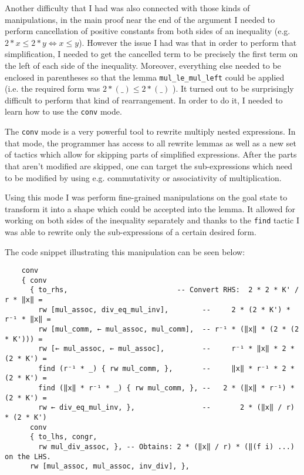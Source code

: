 \documentclass[11pt]{article}
\newenvironment{code}{\captionsetup{type=listing}}{}
\begin{document}
Another difficulty that I had was also connected with those kinds of manipulations,
in the main proof near the end of the argument I needed to perform cancellation
of positive constants from both sides of an inequality (e.g. $2 * x \le 2 * y \iff x \le y$).
However the issue I had was that in order to perform that simplification, I needed to
get the cancelled term to be precisely the first term on the left of each side of
the inequality. Moreover, everything else needed to be enclosed in parentheses so that
the lemma \texttt{mul\_le\_mul\_left} could be applied (i.e. the required form was
$2 * (\_) \le 2 * (\_)$ ). It turned out to be surprisingly difficult to perform that
kind of rearrangement. In order to do it, I needed to learn how to use the
\texttt{conv} mode.

The \texttt{conv} mode is a very powerful tool to rewrite multiply nested
expressions. In that mode, the programmer has access to all rewrite lemmas as well
as a new set of tactics which allow for skipping parts of simplified expressions.
After the parts that aren't modified are skipped, one can target the sub-expressions
which need to be modified by using e.g. commutativity or associativity of multiplication.

Using this mode I was perform fine-grained manipulations on the goal state to
transform it into a shape which could be accepted into the lemma. It allowed for
working on both sides of the inequality separately and thanks to the \texttt{find}
tactic I was able to rewrite only the sub-expressions of a certain desired form.

The code snippet illustrating this manipulation can be seen below:
\begin{code}
\begin{verbatim}
    conv
    { conv
      { to_rhs,                          -- Convert RHS:  2 * 2 * K' / r * ‖x‖ =
        rw [mul_assoc, div_eq_mul_inv],        --     2 * (2 * K') * r⁻¹ * ‖x‖ =
        rw [mul_comm, ← mul_assoc, mul_comm],  -- r⁻¹ * (‖x‖ * (2 * (2 * K'))) =
        rw [← mul_assoc, ← mul_assoc],         --     r⁻¹ * ‖x‖ * 2 * (2 * K') =
        find (r⁻¹ * _) { rw mul_comm, },       --     ‖x‖ * r⁻¹ * 2 * (2 * K') =
        find (‖x‖ * r⁻¹ * _) { rw mul_comm, }, --   2 * (‖x‖ * r⁻¹) * (2 * K') =
        rw ← div_eq_mul_inv, },                --       2 * (‖x‖ / r) * (2 * K')
      conv
      { to_lhs, congr,
        rw mul_div_assoc, }, -- Obtains: 2 * (‖x‖ / r) * (‖(f i) ...) on the LHS.
      rw [mul_assoc, mul_assoc, inv_div], },
\end{verbatim}
\end{code}
\end{document}
